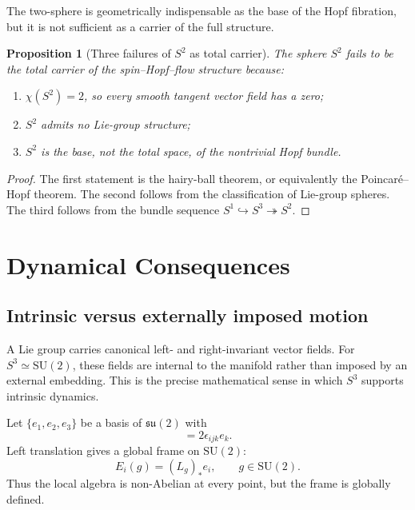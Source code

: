 \documentclass[11pt,a4paper]{article}
\newtheorem{proposition}[theorem]{Proposition}
\theoremstyle{definition}
\theoremstyle{remark}
\newcommand{\Sone}{S^{1}}
\newcommand{\Stwo}{S^{2}}
\newcommand{\Sthree}{S^{3}}
\newcommand{\SU}{\mathrm{SU}}
\begin{document}
The two-sphere is geometrically indispensable as the base of the Hopf fibration, but it is not
sufficient as a carrier of the full structure.

\begin{proposition}[Three failures of $\Stwo$ as total carrier]
The sphere $\Stwo$ fails to be the total carrier of the spin--Hopf--flow structure because:
\begin{enumerate}[label=(\roman*)]
\item $\chi(\Stwo)=2$, so every smooth tangent vector field has a zero;
\item $\Stwo$ admits no Lie-group structure;
\item $\Stwo$ is the base, not the total space, of the nontrivial Hopf bundle.
\end{enumerate}
\end{proposition}

\begin{proof}
The first statement is the hairy-ball theorem, or equivalently the Poincaré--Hopf theorem.
The second follows from the classification of Lie-group spheres.  The third follows from the
bundle sequence $\Sone\hookrightarrow\Sthree\twoheadrightarrow\Stwo$.
\end{proof}

\section{Dynamical Consequences}

\subsection{Intrinsic versus externally imposed motion}

A Lie group carries canonical left- and right-invariant vector fields.  For
$\Sthree\simeq\SU(2)$, these fields are internal to the manifold rather than imposed by an
external embedding.  This is the precise mathematical sense in which $\Sthree$ supports
intrinsic dynamics.

Let $\{e_{1},e_{2},e_{3}\}$ be a basis of $\mathfrak{su}(2)$ with
\begin{equation}
[e_{i},e_{j}]=2\epsilon_{ijk}e_{k}.
\end{equation}
Left translation gives a global frame on $\SU(2)$:
\begin{equation}
E_{i}(g)=(L_{g})_{*}e_{i},\qquad g\in\SU(2).
\end{equation}
Thus the local algebra is non-Abelian at every point, but the frame is globally defined.
\end{document}
